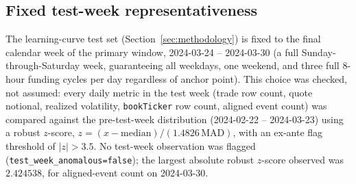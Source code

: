 \subsection{Fixed test-week representativeness}
\label{sec:data-testweek}

The learning-curve test set (Section~\ref{sec:methodology}) is fixed to
the final calendar week of the primary window, 2024-03-24 -- 2024-03-30
(a full Sunday-through-Saturday week, guaranteeing all weekdays, one
weekend, and three full 8-hour funding cycles per day regardless of
anchor point). This choice was checked, not assumed: every daily metric
in the test week (trade row count, quote notional, realized volatility,
\texttt{bookTicker} row count, aligned event count) was compared against
the pre-test-week distribution (2024-02-22 -- 2024-03-23) using a robust
$z$-score, $z = (x - \mathrm{median})/(1.4826\,\mathrm{MAD})$, with an
ex-ante flag threshold of $|z| > 3.5$. No test-week observation was
flagged (\texttt{test\_week\_anomalous=false}); the largest absolute
robust $z$-score observed was $2.424538$, for aligned-event count on
2024-03-30.
